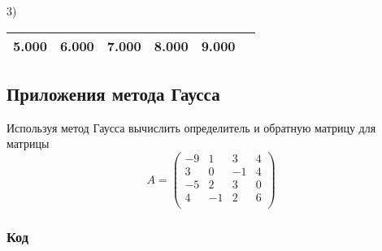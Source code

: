 \documentclass[bachelor, och, pract]{SCWorks}
\begin{document}
3)
\begin{table}[h]
    \centering
    \begin{tabular}{|c|c|c|c|c|c|}
\hline 5.000 & 6.000 & 7.000 & 8.000 & 9.000\\\hline
    \end{tabular}
\end{table}


\subsection{Приложения метода Гаусса}

Используя метод Гаусса вычислить определитель и обратную матрицу для матрицы
$$A = \begin{pmatrix}
-9 & 1 & 3 & 4 \\
3 & 0 & -1 & 4 \\
-5 & 2 & 3 & 0 \\
4 & -1 & 2 & 6 \\
\end{pmatrix}$$


\subsubsection{Код}
\end{document}
